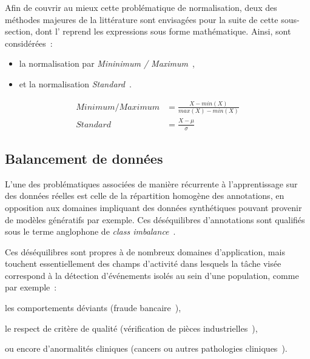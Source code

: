 Afin de couvrir au mieux cette problématique de normalisation, deux des méthodes majeures de la littérature sont envisagées pour la suite de cette sous-section, dont l' reprend les expressions sous forme mathématique. Ainsi, sont considérées~:
\begin{itemize}
    \item la normalisation par \textit{Mininimum / Maximum}~\cite{Juszczak2002},
    \item et la normalisation \textit{Standard}~\cite{Celebi2007}.
\end{itemize}\par

\begin{equation} 
    \label{eq:scaling_methods}
    \begin{split}
    Minimum/Maximum&=\frac{X-min(X)}{max(X)-min(X)}  \\
    Standard&=\frac{X-\mu{}}{\sigma}	    
    \end{split}
\end{equation}

\subsection{Balancement de données}
\label{subsec:balancement}
L'une des problématiques associées de manière récurrente à l'apprentissage sur des données réelles est celle de la répartition homogène des annotations, en opposition aux domaines impliquant des données synthétiques pouvant provenir de modèles génératifs par exemple. Ces déséquilibres d'annotations sont qualifiés sous le terme anglophone de \textit{class imbalance}~\cite{Prati2009, HaiboHe2009}.\par

Ces déséquilibres sont propres à de nombreux domaines d'application, mais touchent essentiellement des champs d'activité dans lesquels la tâche visée correspond à la détection d'événements isolés au sein d'une population, comme par exemple~:~
\begin{inlinerate}
    \item les comportements déviants (fraude bancaire~\cite{Phua2004}),
    \item le respect de critère de qualité (vérification de pièces industrielles~\cite{Wu2018}),
    \item ou encore d'anormalités cliniques (cancers ou autres pathologies cliniques~\cite{Celebi2007}).
\end{inlinerate}\par

